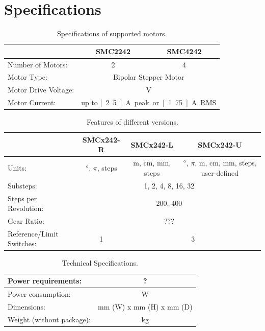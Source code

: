 \section{Specifications}


\begin{table}[htbp]
\label{motor_specs}
\caption[Specifications of supported motors.]{Specifications of supported motors.}
\centering
\begin{tabular}{|l|c|c|}
\hline 
 & SMC2242 & SMC4242 \\ \hline 
Number of Motors: & 2 & 4 \\ \hline
Motor Type: & \multicolumn{2}{c|}{Bipolar Stepper Motor} \\ \hline
Motor Drive Voltage: & \multicolumn{2}{c|}{\unit[24]{V}} \\ \hline
Motor Current: & \multicolumn{2}{c|}{up to \unit[2.5]{A} peak or \unit[1.75]{A} RMS} \\ \hline
\end{tabular}
\end{table}


\begin{table}[htbp]
\label{features_of_versions}
\caption[Features of different versions.]{Features of different versions.}
\centering
\begin{tabular}{|l|c|c|c|}
\hline 
 & SMCx242-R & SMCx242-L & SMCx242-U \\ \hline 
Units: & $\degree$, $\pi$, steps & m, cm, mm, steps & $\degree$, $\pi$, m, cm, mm, steps, user-defined \\ \hline
Substeps: & \multicolumn{3}{c|}{1, 2, 4, 8, 16, 32} \\ \hline
Steps per Revolution: & \multicolumn{3}{c|}{200, 400} \\ \hline
Gear Ratio: & \multicolumn{3}{c|}{???} \\ \hline
Reference/Limit Switches: & 1 & \multicolumn{2}{c|}{3} \\ \hline
\end{tabular}
\end{table}


\begin{table}[htbp]
\label{motor_specs}
\caption[Technical Specifications.]{Technical Specifications.}
\centering
\begin{tabular}{|l|c|}
\hline 
Power requirements: & ? \\ \hline 
Power consumption: & \unit[]{W} \\ \hline 
Dimensions: & \unit[245]{mm} (W) x \unit[85]{mm} (H) x \unit[260]{mm} (D) \\ \hline 
Weight (without package): & \unit[]{kg} \\ \hline 
\end{tabular}
\end{table}



